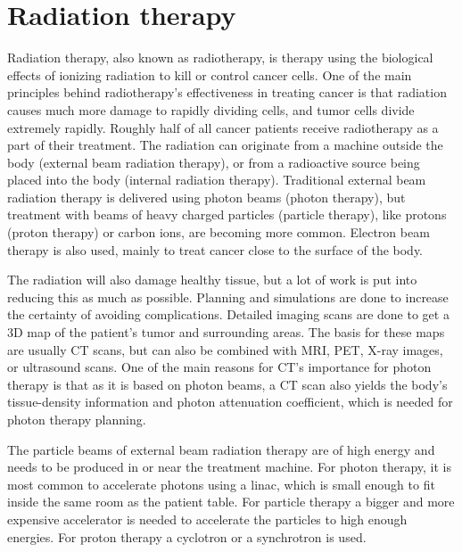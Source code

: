 \documentclass[../main/thesis.tex]{subfiles}
\begin{document}

\section{Radiation therapy}
\label{t-therapy}
Radiation therapy, also known as radiotherapy, is therapy using the biological effects of ionizing radiation to kill or control cancer cells. One of the main principles behind radiotherapy's effectiveness in treating cancer is that radiation causes much more damage to rapidly dividing cells, and tumor cells divide extremely rapidly. \citep[chap. 45]{Serway} Roughly half of all cancer patients receive radiotherapy as a part of their treatment. The radiation can originate from a machine outside the body (external beam radiation therapy), or from a radioactive source being placed into the body (internal radiation therapy). Traditional external beam radiation therapy is delivered using photon beams (photon therapy), but treatment with beams of heavy charged particles (particle therapy), like protons (proton therapy) or carbon ions, are becoming more common. Electron beam therapy is also used, mainly to treat cancer close to the surface of the body. \citep{nih}

The radiation will also damage healthy tissue, but a lot of work is put into reducing this as much as possible. Planning and simulations are done to increase the certainty of avoiding complications. Detailed imaging scans are done to get a 3D map of the patient's tumor and surrounding areas. The basis for these maps are usually \gls{CT} scans, but can also be combined with \gls{MRI}, \gls{PET}, X-ray images, or ultrasound scans. \citep{nih} One of the main reasons for \gls{CT}'s importance for photon therapy is that as it is based on photon beams, a \gls{CT} scan also yields the body's tissue-density information and photon attenuation coefficient, which is needed for photon therapy planning.  \citep[chap. 12]{Khan}

The particle beams of external beam radiation therapy are of high energy and needs to be produced in or near the treatment machine. For photon therapy, it is most common to accelerate photons using a \gls{linac}, which is small enough to fit inside the same room as the patient table. \citep{nih} For particle therapy a bigger and more expensive accelerator is needed to accelerate the particles to high enough energies. For proton therapy a cyclotron or a synchrotron is used. \citep[chap. 27]{Khan}
\end{document}
